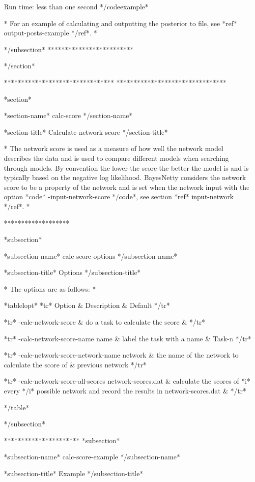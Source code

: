 Run time: less than one second */codeexample*

* For an example of calculating and outputting the posterior to file, see *ref* output-posts-example */ref*. *

*/subsection* *************************

*/section*

******************************** ********************************

*section*

*section-name* calc-score */section-name*

*section-title* Calculate network score */section-title*

* The network score is used as a measure of how well the network model describes the data and is used to compare different models when searching through models. By convention the lower the score the better the model is and is typically based on the negative log likelihood. BayesNetty considers the network score to be a property of the network and is set when the network input with the option *code* -input-network-score */code*, see section *ref* input-network */ref*. *

*******************

*subsection*

*subsection-name* calc-score-options */subsection-name*

*subsection-title* Options */subsection-title*

* The options are as follows: *

*tablelopt* *tr* Option & Description & Default */tr*

*tr*
 -calc-network-score  & do a task to calculate the score &
*/tr*

*tr*
  -calc-network-score-name name & label the task with a name & Task-n
*/tr*

*tr*
  -calc-network-score-network-name network & the name of the network to calculate the score of & previous network
*/tr*

*tr*
  -calc-network-score-all-scores network-scores.dat & calculate the scores of *i* every */i* possible network and record the results in network-scores.dat &
*/tr*

*/table*

*/subsection*


********************** *subsection*

*subsection-name* calc-score-example */subsection-name*

*subsection-title* Example */subsection-title*

